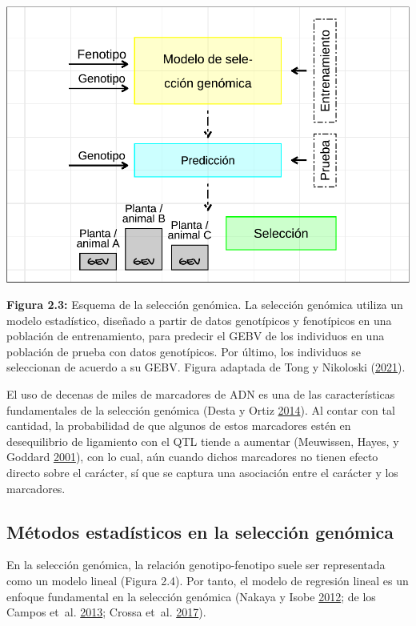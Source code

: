 \documentclass[11pt,spanish,a4paper,oneside,]{book} %
\begin{document}
\newpage

\begin{center}\includegraphics[width=1\linewidth]{figures/GS} \end{center}

\textbf{Figura 2.3:} Esquema de la selección genómica. La selección genómica utiliza un modelo estadístico, diseñado a partir de datos genotípicos y fenotípicos en una población de entrenamiento, para predecir el GEBV de los individuos en una población de prueba con datos genotípicos. Por último, los individuos se seleccionan de acuerdo a su GEBV. Figura adaptada de Tong y Nikoloski (\protect\hyperlink{ref-cite:7}{2021}).

El uso de decenas de miles de marcadores de ADN es una de las características fundamentales de la selección genómica (Desta y Ortiz \protect\hyperlink{ref-cite:10}{2014}). Al contar con tal cantidad, la probabilidad de que algunos de estos marcadores estén en desequilibrio de ligamiento con el QTL tiende a aumentar (Meuwissen, Hayes, y Goddard \protect\hyperlink{ref-cite:8}{2001}), con lo cual, aún cuando dichos marcadores no tienen efecto directo sobre el carácter, sí que se captura una asociación entre el carácter y los marcadores.

\hypertarget{muxe9todos-estaduxedsticos-en-la-selecciuxf3n-genuxf3mica}{%
\subsection{Métodos estadísticos en la selección genómica}\label{muxe9todos-estaduxedsticos-en-la-selecciuxf3n-genuxf3mica}}

En la selección genómica, la relación genotipo-fenotipo suele ser representada como un modelo lineal (Figura 2.4). Por tanto, el modelo de regresión lineal es un enfoque fundamental en la selección genómica (Nakaya y Isobe \protect\hyperlink{ref-cite:6}{2012}; de los Campos et~al. \protect\hyperlink{ref-cite:31}{2013}; Crossa et~al. \protect\hyperlink{ref-cite:37}{2017}).
\end{document}
